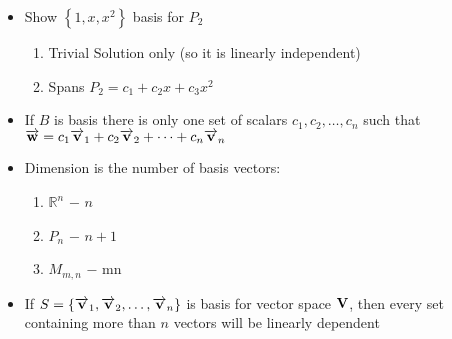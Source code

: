 \documentclass[12pt]{article}
\begin{document}
\begin{itemize}
  \item Show $\left\{ 1,x,x^2 \right\}$ basis for $P_2$

    \begin{enumerate}

      \item Trivial Solution only (so it is linearly independent)

      \item Spans $P_2=c_1+c_2x+c_3x^2$

    \end{enumerate}

  \item If $B$ is basis there is only one set of scalars $c_1,c_2,\dots,c_n$ such that $\overrightarrow{\bold{w}}=c_1\overrightarrow{\bold{v}}_1+c_2\overrightarrow{\bold{v}}_2+\dots+c_n\overrightarrow{\bold{v}}_n$

  \item Dimension is the number of basis vectors:

    \begin{enumerate}

      \item $\mathbb{R}^n$ $-$ $n$

      \item $P_n$ $-$ $n+1$

      \item $M_{m,n}$ $-$ m\cdot n

    \end{enumerate}

  \item If $S=\left\{ \overrightarrow{\bold{v}}_1,\overrightarrow{\bold{v}}_2,\dots,\overrightarrow{\bold{v}}_n \right\}$ is basis for vector space $\bold{V}$, then every set containing more than $n$ vectors will be linearly dependent

\end{itemize}
\end{document}

